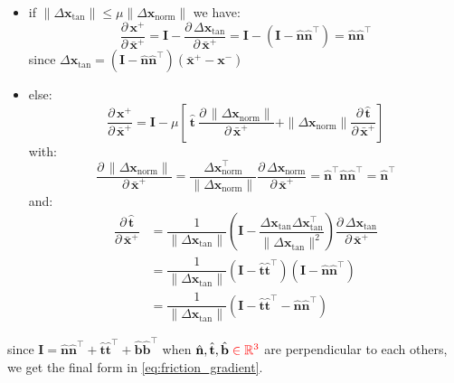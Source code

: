 \documentclass{article}
\newcommand{\pd}[2]{\dfrac{\partial\, #1}{\partial\, #2}}
\newcommand{\red}[1]{\textcolor{red}{#1}}
\begin{document}
\begin{derivation}
\begin{itemize}
\item if $\|\Delta\mathbf{x}_{\text{tan}}\| \leq \mu\|\Delta\mathbf{x}_{\text{norm}}\|$ we have:
\begin{equation*}
    \pd{\mathbf{x}^+}{\bar{\mathbf{x}}^+} = \mathbf{I} - \pd{\Delta\mathbf{x}_{\text{tan}}}{\bar{\mathbf{x}}^+} = \mathbf{I} - (\mathbf{I} - \hat{\mathbf{n}}\hat{\mathbf{n}}^\top) = \hat{\mathbf{n}}\hat{\mathbf{n}}^\top
\end{equation*} 
since $\Delta\mathbf{x}_{\text{tan}} = (\mathbf{I} - \hat{\mathbf{n}}\hat{\mathbf{n}}^\top)(\bar{\mathbf{x}}^+ - \mathbf{x}^-)$
\item else:
\begin{equation*}
    \pd{\mathbf{x}^+}{\bar{\mathbf{x}}^+} = 
    \mathbf{I} - \mu\left[\ \hat{\mathbf{t}}\ \pd{\|\Delta\mathbf{x}_{\text{norm}}\|}{\bar{\mathbf{x}}^+} + \|\Delta\mathbf{x}_{\text{norm}}\|\pd{\hat{\mathbf{t}}}{\bar{\mathbf{x}}^+}\right]
\end{equation*} 
with:
\begin{equation*}
\pd{\|\Delta\mathbf{x}_{\text{norm}}\|}{\bar{\mathbf{x}}^+} = 
\frac{\Delta\mathbf{x}_{\text{norm}}^\top}{\|\Delta\mathbf{x}_{\text{norm}}\|}\pd{\Delta\mathbf{x}_{\text{norm}}}{\bar{\mathbf{x}}^+} = \hat{\mathbf{n}}^\top\hat{\mathbf{n}}\hat{\mathbf{n}}^\top = 
\hat{\mathbf{n}}^\top
\end{equation*} 
and:
\begin{align*}
\pd{\hat{\mathbf{t}}}{\bar{\mathbf{x}}^+} 
&= 
\dfrac{1}{\|\Delta\mathbf{x}_{\text{tan}}\|}\left(\mathbf{I} - \dfrac{\Delta\mathbf{x}_{\text{tan}}\Delta\mathbf{x}_{\text{tan}}^\top}{\|\Delta\mathbf{x}_{\text{tan}}\|^2}\right)\pd{\Delta\mathbf{x}_{\text{tan}}}{\bar{\mathbf{x}}^+} \\[1ex]
&= 
\dfrac{1}{\|\Delta\mathbf{x}_{\text{tan}}\|}(\mathbf{I} - \hat{\mathbf{t}}\hat{\mathbf{t}}^\top)(\mathbf{I} - \hat{\mathbf{n}}\hat{\mathbf{n}}^\top) \\[1ex]
&= 
\dfrac{1}{\|\Delta\mathbf{x}_{\text{tan}}\|}(\mathbf{I} - \hat{\mathbf{t}}\hat{\mathbf{t}}^\top - \hat{\mathbf{n}}\hat{\mathbf{n}}^\top)
\end{align*} 
\end{itemize}
since $\mathbf{I} = \hat{\mathbf{n}}\hat{\mathbf{n}}^\top + \hat{\mathbf{t}}\hat{\mathbf{t}}^\top + \hat{\mathbf{b}}\hat{\mathbf{b}}^\top$ when $\hat{\mathbf{n}}, \hat{\mathbf{t}}, \hat{\mathbf{b}}\; \red{\in \mathbb{R}^3}$ are perpendicular to each others, we get the final form in \eqref{eq:friction_gradient}.
\end{derivation}
\end{document}
